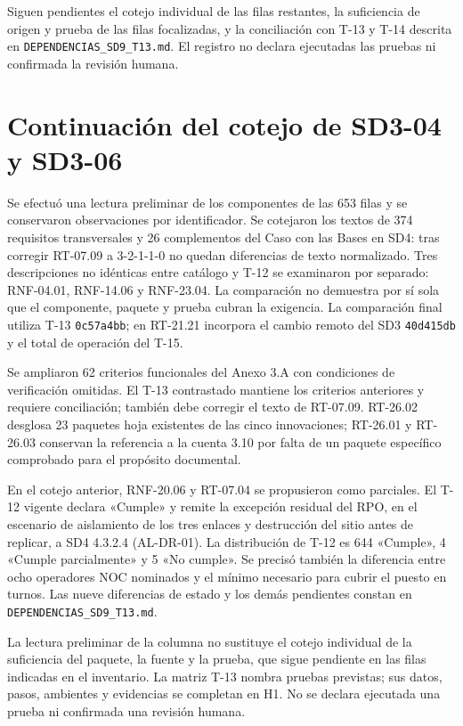 \documentclass[11pt,letterpaper]{article}
\begin{document}
Siguen pendientes el cotejo individual de las filas restantes, la suficiencia de origen y prueba de las filas focalizadas, y la conciliación con T-13 y T-14 descrita en \texttt{DEPENDENCIAS\_SD9\_T13.md}. El registro no declara ejecutadas las pruebas ni confirmada la revisión humana.

\section*{Continuación del cotejo de SD3-04 y SD3-06}

Se efectuó una lectura preliminar de los componentes de las 653 filas y se conservaron observaciones por identificador. Se cotejaron los textos de 374 requisitos transversales y 26 complementos del Caso con las Bases en SD4: tras corregir RT-07.09 a 3-2-1-1-0 no quedan diferencias de texto normalizado. Tres descripciones no idénticas entre catálogo y T-12 se examinaron por separado: RNF-04.01, RNF-14.06 y RNF-23.04. La comparación no demuestra por sí sola que el componente, paquete y prueba cubran la exigencia. La comparación final utiliza T-13 \texttt{0c57a4bb}; en RT-21.21 incorpora el cambio remoto del SD3 \texttt{40d415db} y el total de operación del T-15.

Se ampliaron 62 criterios funcionales del Anexo 3.A con condiciones de verificación omitidas. El T-13 contrastado mantiene los criterios anteriores y requiere conciliación; también debe corregir el texto de RT-07.09. RT-26.02 desglosa 23 paquetes hoja existentes de las cinco innovaciones; RT-26.01 y RT-26.03 conservan la referencia a la cuenta 3.10 por falta de un paquete específico comprobado para el propósito documental.

En el cotejo anterior, RNF-20.06 y RT-07.04 se propusieron como parciales. El T-12 vigente declara «Cumple» y remite la excepción residual del RPO, en el escenario de aislamiento de los tres enlaces y destrucción del sitio antes de replicar, a SD4 4.3.2.4 (AL-DR-01). La distribución de T-12 es 644 «Cumple», 4 «Cumple parcialmente» y 5 «No cumple». Se precisó también la diferencia entre ocho operadores NOC nominados y el mínimo necesario para cubrir el puesto en turnos. Las nueve diferencias de estado y los demás pendientes constan en \texttt{DEPENDENCIAS\_SD9\_T13.md}.

La lectura preliminar de la columna no sustituye el cotejo individual de la suficiencia del paquete, la fuente y la prueba, que sigue pendiente en las filas indicadas en el inventario. La matriz T-13 nombra pruebas previstas; sus datos, pasos, ambientes y evidencias se completan en H1. No se declara ejecutada una prueba ni confirmada una revisión humana.
\end{document}
